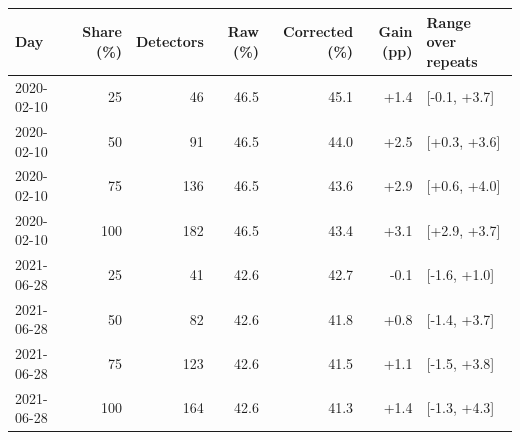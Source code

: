 \begin{tabular}{@{}lrrrrrl@{}}\toprule
Day & Share (\%) & Detectors & Raw (\%) & Corrected (\%) & Gain (pp) & Range over repeats \\\midrule
2020-02-10 & 25 & 46 & 46.5 & 45.1 & +1.4 & [-0.1, +3.7] \\
2020-02-10 & 50 & 91 & 46.5 & 44.0 & +2.5 & [+0.3, +3.6] \\
2020-02-10 & 75 & 136 & 46.5 & 43.6 & +2.9 & [+0.6, +4.0] \\
2020-02-10 & 100 & 182 & 46.5 & 43.4 & +3.1 & [+2.9, +3.7] \\
2021-06-28 & 25 & 41 & 42.6 & 42.7 & -0.1 & [-1.6, +1.0] \\
2021-06-28 & 50 & 82 & 42.6 & 41.8 & +0.8 & [-1.4, +3.7] \\
2021-06-28 & 75 & 123 & 42.6 & 41.5 & +1.1 & [-1.5, +3.8] \\
2021-06-28 & 100 & 164 & 42.6 & 41.3 & +1.4 & [-1.3, +4.3] \\
\bottomrule\end{tabular}
